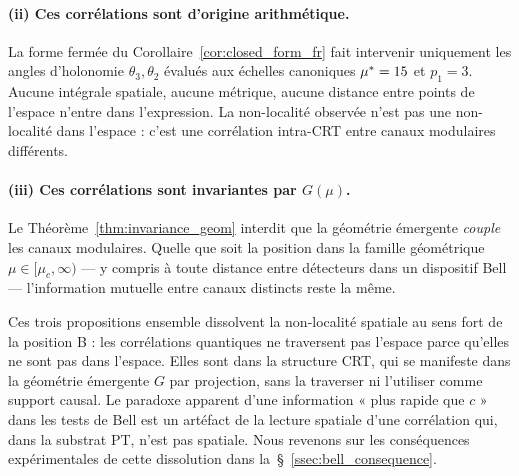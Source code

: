 \paragraph{(ii) Ces corrélations sont d'origine arithmétique.}
La forme fermée du Corollaire~\ref{cor:closed_form_fr}
fait intervenir uniquement les angles d'holonomie $\theta_3,
\theta_2$ évalués aux échelles canoniques ${\mu^{*}} = 15$ et
$p_1 = 3$. Aucune intégrale spatiale, aucune métrique, aucune
distance entre points de l'espace n'entre dans l'expression. La
non-localité observée n'est pas une non-localité dans
l'espace : c'est une corrélation intra-CRT entre canaux modulaires
différents.

\paragraph{(iii) Ces corrélations sont invariantes par $G(\mu)$.}
Le Théorème~\ref{thm:invariance_geom} interdit que la géométrie
émergente \emph{couple} les canaux modulaires. Quelle que soit la
position dans la famille géométrique
$\mu \in [\mu_c, \infty)$ --- y compris à toute distance entre
détecteurs dans un dispositif Bell --- l'information mutuelle entre
canaux distincts reste la même.

Ces trois propositions ensemble dissolvent la non-localité
spatiale au sens fort de la position B : les corrélations
quantiques ne traversent pas l'espace parce qu'elles ne sont pas
dans l'espace. Elles sont dans la structure CRT, qui se manifeste
dans la géométrie émergente $G$ par projection, sans la traverser
ni l'utiliser comme support causal. Le paradoxe apparent d'une
information « plus rapide que $c$ » dans les tests de Bell est un
artéfact de la lecture spatiale d'une corrélation qui, dans la
substrat PT, n'est pas spatiale. Nous revenons sur les conséquences
expérimentales de cette dissolution dans
la~\S~\ref{ssec:bell_consequence}.
